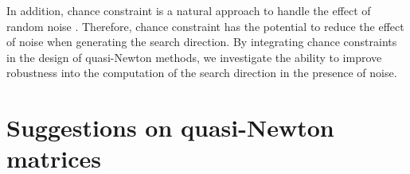 \documentclass[11pt,twoside]{article}
\begin{document}
In addition, chance constraint is a natural approach to handle the
effect of random noise \cite{Ahm18}.  Therefore, chance constraint has
the potential to reduce the effect of noise when generating the search
direction.  By integrating chance constraints in the design of
quasi-Newton methods, we investigate the ability to improve robustness
into the computation of the search direction in the presence of noise.




\section{Suggestions on quasi-Newton matrices}\label{sec-Bk}
\end{document}
